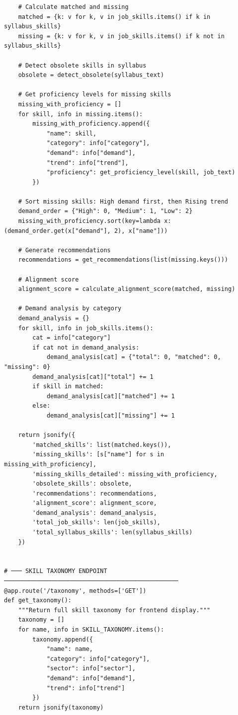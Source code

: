 \documentclass[12pt,a4paper]{report}
\begin{document}
\begin{verbatim}
    # Calculate matched and missing
    matched = {k: v for k, v in job_skills.items() if k in syllabus_skills}
    missing = {k: v for k, v in job_skills.items() if k not in syllabus_skills}

    # Detect obsolete skills in syllabus
    obsolete = detect_obsolete(syllabus_text)

    # Get proficiency levels for missing skills
    missing_with_proficiency = []
    for skill, info in missing.items():
        missing_with_proficiency.append({
            "name": skill,
            "category": info["category"],
            "demand": info["demand"],
            "trend": info["trend"],
            "proficiency": get_proficiency_level(skill, job_text)
        })

    # Sort missing skills: High demand first, then Rising trend
    demand_order = {"High": 0, "Medium": 1, "Low": 2}
    missing_with_proficiency.sort(key=lambda x: (demand_order.get(x["demand"], 2), x["name"]))

    # Generate recommendations
    recommendations = get_recommendations(list(missing.keys()))

    # Alignment score
    alignment_score = calculate_alignment_score(matched, missing)

    # Demand analysis by category
    demand_analysis = {}
    for skill, info in job_skills.items():
        cat = info["category"]
        if cat not in demand_analysis:
            demand_analysis[cat] = {"total": 0, "matched": 0, "missing": 0}
        demand_analysis[cat]["total"] += 1
        if skill in matched:
            demand_analysis[cat]["matched"] += 1
        else:
            demand_analysis[cat]["missing"] += 1

    return jsonify({
        'matched_skills': list(matched.keys()),
        'missing_skills': [s["name"] for s in missing_with_proficiency],
        'missing_skills_detailed': missing_with_proficiency,
        'obsolete_skills': obsolete,
        'recommendations': recommendations,
        'alignment_score': alignment_score,
        'demand_analysis': demand_analysis,
        'total_job_skills': len(job_skills),
        'total_syllabus_skills': len(syllabus_skills)
    })


# ─── SKILL TAXONOMY ENDPOINT ─────────────────────────────────────────────────
@app.route('/taxonomy', methods=['GET'])
def get_taxonomy():
    """Return full skill taxonomy for frontend display."""
    taxonomy = []
    for name, info in SKILL_TAXONOMY.items():
        taxonomy.append({
            "name": name,
            "category": info["category"],
            "sector": info["sector"],
            "demand": info["demand"],
            "trend": info["trend"]
        })
    return jsonify(taxonomy)



\end{verbatim}
\end{document}
